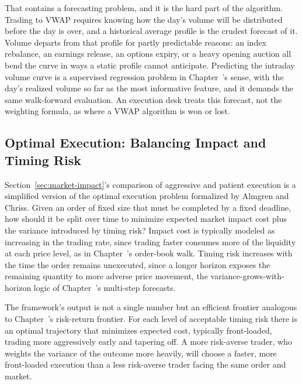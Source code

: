 \documentclass[../ai_in_finance]{subfiles}
\begin{document}
That contains a forecasting problem, and it is the hard part of the algorithm. Trading to VWAP requires knowing how the day's volume will be distributed before the day is over, and a historical average profile is the crudest forecast of it. Volume departs from that profile for partly predictable reasons: an index rebalance, an earnings release, an options expiry, or a heavy opening auction all bend the curve in ways a static profile cannot anticipate. Predicting the intraday volume curve is a supervised regression problem in Chapter~'s sense, with the day's realized volume so far as the most informative feature, and it demands the same walk-forward evaluation. An execution desk treats this forecast, not the weighting formula, as where a VWAP algorithm is won or lost.

\subsection{Optimal Execution: Balancing Impact and Timing Risk}
\label{sec:optimal-execution}

Section~\ref{sec:market-impact}'s comparison of aggressive and patient execution is a simplified version of the optimal execution problem formalized by Almgren and Chriss. Given an order of fixed size that must be completed by a fixed deadline, how should it be split over time to minimize expected market impact cost plus the variance introduced by timing risk? Impact cost is typically modeled as increasing in the trading rate, since trading faster consumes more of the liquidity at each price level, as in Chapter~'s order-book walk. Timing risk increases with the time the order remains unexecuted, since a longer horizon exposes the remaining quantity to more adverse price movement, the variance-grows-with-horizon logic of Chapter~'s multi-step forecasts.

The framework's output is not a single number but an efficient frontier analogous to Chapter~'s risk-return frontier. For each level of acceptable timing risk there is an optimal trajectory that minimizes expected cost, typically front-loaded, trading more aggressively early and tapering off. A more risk-averse trader, who weights the variance of the outcome more heavily, will choose a faster, more front-loaded execution than a less risk-averse trader facing the same order and market.
\end{document}
